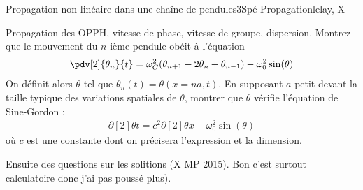 \begin{exercise}{Propagation non-linéaire dans une chaîne de pendules}{3}{Spé}
{Propagation}{lelay, X}

\begin{questions}
    \questioncours Propagation des OPPH, vitesse de phase, vitesse de groupe, dispersion.
    \question Montrez que le mouvement du $n$ ième pendule obéit à l'équation
    \begin{align*}
        \pdv[2]{\theta_n}{t} = \omega_C^2 (\theta_{n+1} - 2\theta_n + \theta_{n-1}) - \omega_0^2 \sin(\theta)
    \end{align*}
    \question On définit alors $\theta$ tel que $\theta_n(t) = \theta(x = na, t)$. En supposant $a$ petit devant la taille typique des variations spatiales de $\theta$, montrer que $\theta$ vérifie l'équation de Sine-Gordon :
    \begin{align*}
        \partial[2]{\theta}{t} = c^2 \partial[2]{\theta}{x} - \omega_0^2\sin(\theta)
    \end{align*}
    où $c$ est une constante dont on précisera l'expression et la dimension.
    
    \question Ensuite des questions sur les solitions (X MP 2015). Bon c'est surtout calculatoire donc j'ai pas poussé plus).
\end{questions}

\end{exercise}